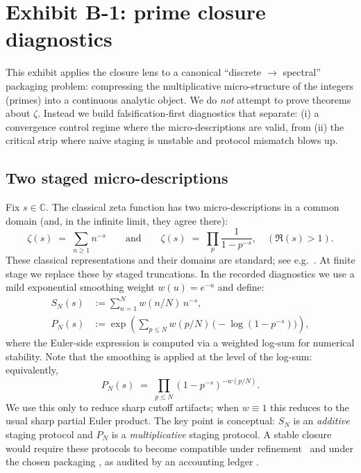 \section{Exhibit B-1: prime closure diagnostics}
\label{sec:exhibit-prime}

This exhibit applies the \SBT closure lens to a canonical ``discrete $\rightarrow$ spectral'' packaging problem:
compressing the multiplicative micro-structure of the integers (primes) into a continuous analytic object.
We do \emph{not} attempt to prove theorems about $\zeta$.
Instead we build falsification-first diagnostics that separate:
(i) a convergence control regime where the micro-descriptions are valid, from
(ii) the critical strip where naive staging is unstable and protocol mismatch blows up.

\subsection{Two staged micro-descriptions}
Fix $s\in\mathbb{C}$.
The classical zeta function has two micro-descriptions in a common domain (and, in the infinite limit, they agree there):
\[
\zeta(s)\;=\;\sum_{n\ge 1} n^{-s}
\qquad\text{and}\qquad
\zeta(s)\;=\;\prod_{p}\frac{1}{1-p^{-s}},
\quad (\Re(s)>1).
\]
These classical representations and their domains are standard; see e.g.\ \cite{Titchmarsh1986}.
At finite stage we replace these by staged truncations.
In the recorded diagnostics we use a mild exponential smoothing weight $w(u)=e^{-u}$ and define:
\begin{align*}
S_N(s) &:= \sum_{n=1}^{N} w(n/N)\,n^{-s},
\\
P_N(s) &:= \exp\!\left(\sum_{p\le N} w(p/N)\,\bigl(-\log(1-p^{-s})\bigr)\right),
\end{align*}
where the Euler-side expression is computed via a weighted log-sum for numerical stability.
Note that the smoothing is applied at the level of the log-sum:
equivalently,
\[
P_N(s) \;=\; \prod_{p\le N} (1-p^{-s})^{-w(p/N)}.
\]
We use this only to reduce sharp cutoff artifacts; when $w\equiv 1$ this reduces to the usual sharp partial Euler product.
The key \SBT point is conceptual:
$S_N$ is an \emph{additive} staging protocol and $P_N$ is a \emph{multiplicative} staging protocol.
A stable closure would require these protocols to become compatible under refinement \Pfour\ and under the chosen packaging \Pfive, as audited by an accounting ledger \Psix.

